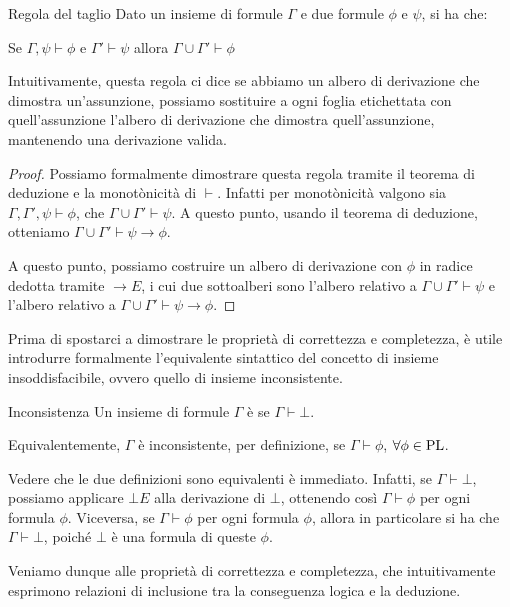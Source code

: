 \begin{theorem}{Regola del taglio}
  Dato un insieme di formule \(\Gamma\) e due formule \(\phi\) e \(\psi\), si ha che:
  
  Se \(\Gamma, \psi \vdash \phi\) e \(\Gamma' \vdash \psi\) allora \(\Gamma \cup \Gamma' \vdash \phi\)
\end{theorem}

Intuitivamente, questa regola ci dice se abbiamo un albero di derivazione che dimostra un'assunzione, possiamo sostituire a ogni foglia etichettata con quell'assunzione l'albero di derivazione che dimostra quell'assunzione, mantenendo una derivazione valida.


\begin{proof}
  Possiamo formalmente dimostrare questa regola tramite il teorema di deduzione e la monotònicità di \(\vdash\).
  Infatti per monotònicità valgono sia \(\Gamma, \Gamma', \psi \vdash \phi\), che \(\Gamma \cup \Gamma'\vdash \psi\).
  A questo punto, usando il teorema di deduzione, otteniamo \(\Gamma\cup \Gamma' \vdash \psi \to \phi\).

  A questo punto, possiamo costruire un albero di derivazione con \(\phi\) in radice dedotta tramite \(\to E\), i cui due sottoalberi sono l'albero relativo a \(\Gamma \cup \Gamma' \vdash \psi\) e l'albero relativo a \(\Gamma\cup \Gamma' \vdash \psi \to \phi\).
\end{proof}

Prima di spostarci a dimostrare le proprietà di correttezza e completezza, è utile introdurre formalmente l'equivalente sintattico del concetto di insieme insoddisfacibile, ovvero quello di insieme inconsistente.

\begin{definition}{Inconsistenza}
  Un insieme di formule \(\Gamma\) è  se \(\Gamma \vdash \bot\).

  Equivalentemente, \(\Gamma\) è inconsistente, per definizione, se \(\Gamma \vdash \phi\), \(\forall \phi \in \operatorname{PL}\).
\end{definition}

Vedere che le due definizioni sono equivalenti è immediato.
Infatti, se \(\Gamma \vdash \bot\), possiamo applicare \(\bot E\) alla derivazione di \(\bot\), ottenendo così \(\Gamma \vdash \phi\) per ogni formula \(\phi\). Viceversa, se \(\Gamma \vdash \phi\) per ogni formula \(\phi\), allora in particolare si ha che \(\Gamma \vdash \bot\), poiché \(\bot\) è una formula di queste \(\phi\).

Veniamo dunque alle proprietà di correttezza e completezza, che intuitivamente esprimono relazioni di inclusione tra la conseguenza logica e la deduzione. 

